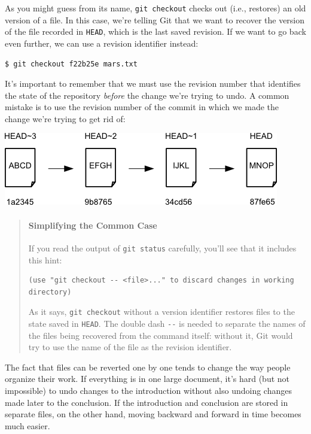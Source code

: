 \documentclass{book}
\begin{document}
As you might guess from its name, \texttt{git checkout} checks out
(i.e., restores) an old version of a file. In this case, we're telling
Git that we want to recover the version of the file recorded in
\texttt{HEAD}, which is the last saved revision. If we want to go back
even further, we can use a revision identifier instead:

\begin{verbatim}
$ git checkout f22b25e mars.txt
\end{verbatim}

It's important to remember that we must use the revision number that
identifies the state of the repository \emph{before} the change we're
trying to undo. A common mistake is to use the revision number of the
commit in which we made the change we're trying to get rid of:

\includegraphics{novice/git/img/git-when-revisions-updated.png}

\begin{quote}
\mbox{}\paragraph{Simplifying the Common Case}

If you read the output of \texttt{git status} carefully, you'll see that
it includes this hint:

\begin{verbatim}
(use "git checkout -- <file>..." to discard changes in working directory)
\end{verbatim}

As it says, \texttt{git checkout} without a version identifier restores
files to the state saved in \texttt{HEAD}. The double dash \texttt{-{}-}
is needed to separate the names of the files being recovered from the
command itself: without it, Git would try to use the name of the file as
the revision identifier.
\end{quote}

The fact that files can be reverted one by one tends to change the way
people organize their work. If everything is in one large document, it's
hard (but not impossible) to undo changes to the introduction without
also undoing changes made later to the conclusion. If the introduction
and conclusion are stored in separate files, on the other hand, moving
backward and forward in time becomes much easier.
\end{document}
